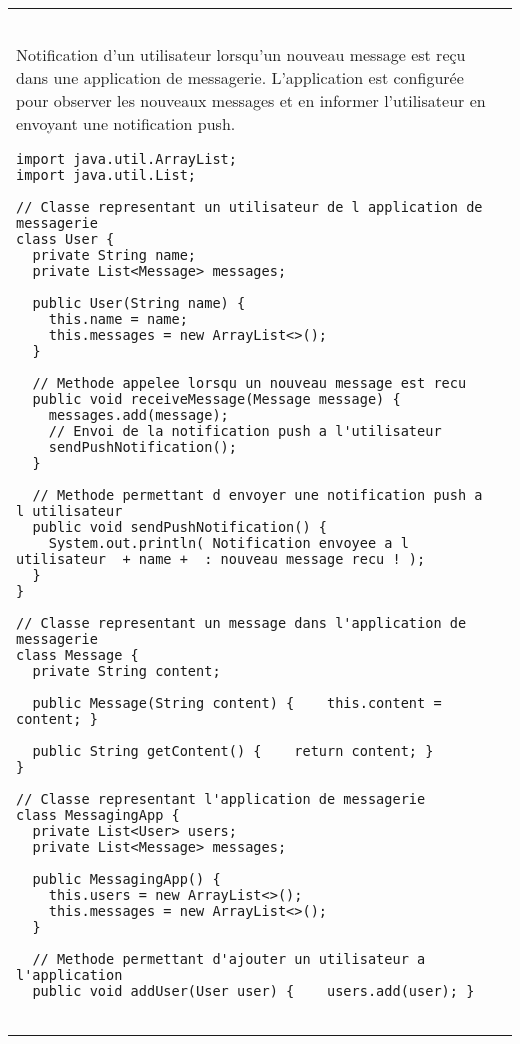 \begin{table}[H]
\begin{adjustbox}{max width=\textwidth}
\begin{tabular}{l|p{\textwidth}}
\begin{minipage}[tl]{0.5\textwidth}
\begin{minipage}[b]{1\textwidth}
\begin{lstlisting}[style=monstyle]
\end{lstlisting} 
\end{minipage}
\end{minipage}
%
\hspace{6mm}
\begin{minipage}[tr]{0.5\textwidth}
\begin{minipage}[t]{1\textwidth}
Notification d'un utilisateur lorsqu'un nouveau message est re\c cu dans une application de messagerie. L'application est configur\'ee pour observer les nouveaux messages et en informer l'utilisateur en envoyant une notification push.  
\end{minipage}
\begin{minipage}[b]{1\textwidth}
\begin{lstlisting}[style=monstyle]
import java.util.ArrayList;
import java.util.List;

// Classe representant un utilisateur de l application de messagerie
class User {
  private String name;
  private List<Message> messages;

  public User(String name) {
    this.name = name;
    this.messages = new ArrayList<>();
  }

  // Methode appelee lorsqu un nouveau message est recu
  public void receiveMessage(Message message) {
    messages.add(message);
    // Envoi de la notification push a l'utilisateur
    sendPushNotification();
  }

  // Methode permettant d envoyer une notification push a l utilisateur
  public void sendPushNotification() {
    System.out.println( Notification envoyee a l utilisateur  + name +  : nouveau message recu ! );
  }
}

// Classe representant un message dans l'application de messagerie
class Message {
  private String content;

  public Message(String content) {    this.content = content; }

  public String getContent() {    return content; }
}

// Classe representant l'application de messagerie
class MessagingApp {
  private List<User> users;
  private List<Message> messages;

  public MessagingApp() {
    this.users = new ArrayList<>();
    this.messages = new ArrayList<>();
  }

  // Methode permettant d'ajouter un utilisateur a l'application
  public void addUser(User user) {    users.add(user); }


\end{lstlisting}
\end{minipage}
\end{minipage}
\end{tabular}
\end{adjustbox}
\end{table}
